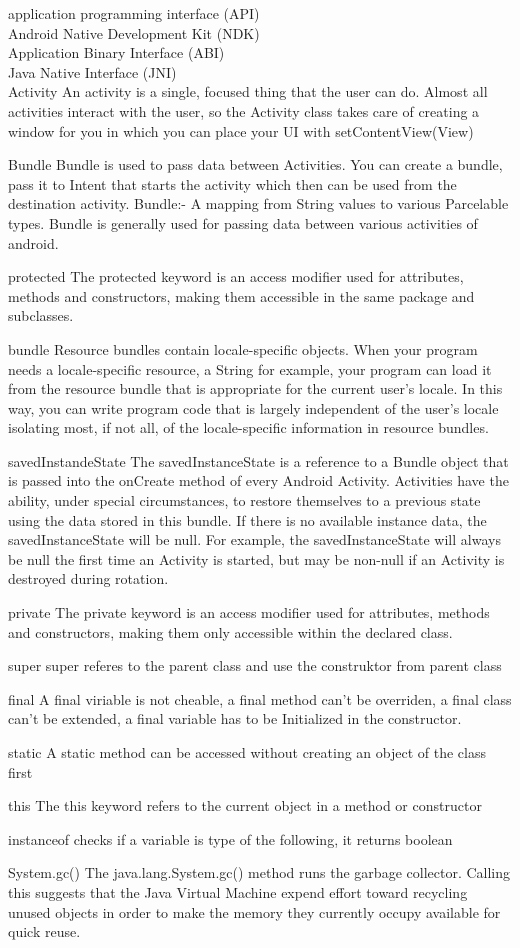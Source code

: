 \documentclass[a4paper,12pt]{article}
\begin{document}
application programming interface (API)\\
Android Native Development Kit (NDK) \\
Application Binary Interface (ABI) \\
Java Native Interface (JNI) \\

Activity
An activity is a single, focused thing that the user can do.
Almost all activities interact with the user, so the Activity class takes care of creating a window for you in which you can place your UI with setContentView(View)

Bundle
Bundle is used to pass data between Activities.
You can create a bundle, pass it to Intent that starts the activity which then can be used from the destination activity.
Bundle:- A mapping from String values to various Parcelable types. Bundle is generally used for passing data between various activities of android.


protected
The protected keyword is an access modifier used for attributes, methods and constructors, 
making them accessible in the same package and subclasses.

bundle
Resource bundles contain locale-specific objects.
 When your program needs a locale-specific resource, a String for example,
 your program can load it from the resource bundle that is appropriate for the current user's locale. In this way, 
you can write program code that is largely independent of the user's locale isolating most, if not all, 
of the locale-specific information in resource bundles.

savedInstandeState
The savedInstanceState is a reference to a Bundle object that is passed into the onCreate method of every Android Activity.
 Activities have the ability, under special circumstances, 
to restore themselves to a previous state using the data stored in this bundle.
 If there is no available instance data, the savedInstanceState will be null. For example, 
the savedInstanceState will always be null the first time an Activity is started, but may be non-null if an Activity is destroyed during rotation.

private
The private keyword is an access modifier used for attributes,
 methods and constructors, 
making them only accessible within the declared class.

super
super referes to the parent class and use the construktor from parent class

final
A final viriable is not cheable, a final method can't be overriden, a final class can't be extended, 
a final variable has to be Initialized in the constructor.

static
A static method can be accessed without creating an object of the class first

this
The this keyword refers to the current object in a method or constructor

instanceof
checks if a variable is type of the following, it returns boolean

System.gc()
The java.lang.System.gc() method runs the garbage collector. 
Calling this suggests that the Java Virtual Machine expend effort 
toward recycling unused objects in order to make the memory they currently occupy available for quick reuse.
\end{document}
